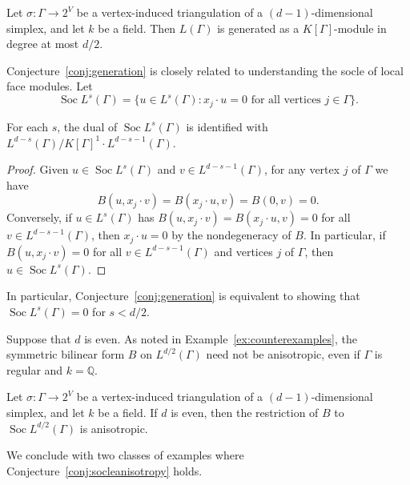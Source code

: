\begin{conj}\label{conj:generation}
Let $\sigma \colon \Gamma \to 2^V$ be a vertex-induced triangulation of a $(d-1)$-dimensional simplex, and let $k$ be a field. Then $L(\Gamma)$ is generated as a $K[\Gamma]$-module in degree at most $d/2$. 
\end{conj}

Conjecture~\ref{conj:generation} is closely related to understanding the socle of local face modules. Let 
$$\operatorname{Soc} L^s(\Gamma) = \{u \in L^s(\Gamma) : x_j \cdot u = 0 \text{ for all vertices }j \in \Gamma\}.$$
\begin{prop}
For each $s$, the dual of $\operatorname{Soc} L^s(\Gamma)$ is identified with $L^{d - s}(\Gamma)/K[\Gamma]^1 \cdot L^{d - s - 1}(\Gamma)$. 
\end{prop}

\begin{proof}
Given $u \in \operatorname{Soc} L^s(\Gamma)$ and $v \in L^{d-s-1}(\Gamma)$, for any vertex $j$ of $\Gamma$ we have
$$B(u, x_j \cdot v) = B(x_j \cdot u, v) = B(0, v) = 0.$$
Conversely, if $u \in L^s(\Gamma)$ has $B(u, x_j \cdot v) = B(x_j \cdot u, v) = 0$ for all $v \in L^{d-s-1}(\Gamma)$,  then $x_j \cdot u = 0$ by the nondegeneracy of $B$. In particular, if  $B(u, x_j \cdot v)  = 0$ for all $v \in L^{d-s-1}(\Gamma)$ and vertices $j$ of $\Gamma$, then $u \in \operatorname{Soc} L^{s}(\Gamma)$. 
\end{proof}

In particular, Conjecture~\ref{conj:generation} is equivalent to showing that $\operatorname{Soc}L^s(\Gamma) = 0$ for \mbox{$s < d/2$}. 

Suppose that $d$ is even. As noted in Example~\ref{ex:counterexamples}, the symmetric bilinear form $B$ on $L^{d/2}(\Gamma)$ need not be anisotropic, even if $\Gamma$ is regular and $k = \mathbb{Q}$. 


\begin{conj}\label{conj:socleanisotropy}
Let $\sigma \colon \Gamma \to 2^V$ be a vertex-induced triangulation of a $(d-1)$-dimensional simplex, and let $k$ be a field. If $d$ is even, then the restriction of $B$ to $\operatorname{Soc} L^{d/2}(\Gamma)$ is anisotropic. 
\end{conj}

We conclude with two classes of examples where Conjecture~\ref{conj:socleanisotropy} holds. 

